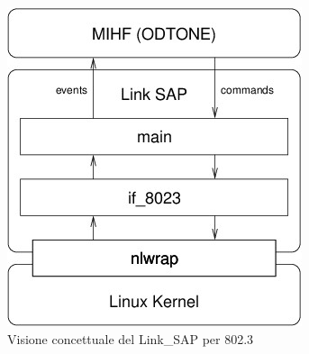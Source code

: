 \begin{figure}[h!]
\centering
\includegraphics[scale=0.8]{sap.jpg}
\caption{Visione concettuale del Link\_SAP per 802.3}
\end{figure}

